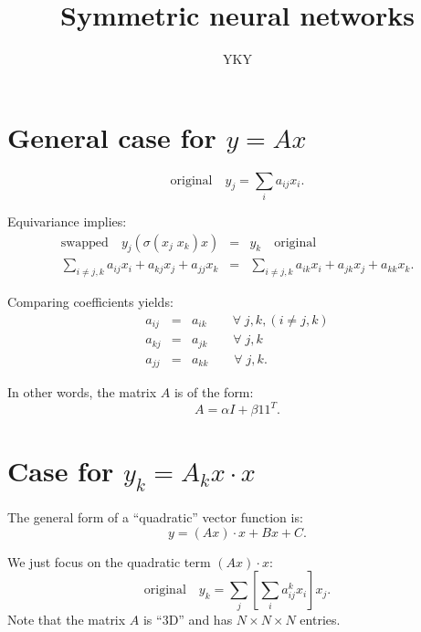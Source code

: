 

\title{Symmetric neural networks}
\author{YKY}


\maketitle

\section{General case for $y = A x$}

\begin{equation}
\boxed{\mbox{original}} \quad y_j = \sum_i a_{ij} x_i .
\end{equation}

Equivariance implies:
\begin{eqnarray}
\boxed{\mbox{swapped}} \quad y_j ( \sigma(x_j \; x_k) x) &=& y_k \quad \boxed{\mbox{original}} \\
\sum_{i \neq j,k} a_{ij} x_i + a_{kj} x_j + a_{jj} x_k &=& \sum_{i \neq j,k} a_{ik} x_i + a_{jk} x_j + a_{kk} x_k . \nonumber
\end{eqnarray}


Comparing coefficients yields:
\begin{eqnarray}
a_{ij} &=& a_{ik} \quad \quad \forall \; j, k, (i \neq j, k) \nonumber \\
a_{kj} &=& a_{jk} \quad \quad \forall \; j, k \nonumber \\
a_{jj} &=& a_{kk} \quad \quad \forall \; j, k .
\end{eqnarray}

In other words, the matrix $A$ is of the form:
\begin{equation}
A = \alpha I + \beta 1 1^T .
\end{equation}

\section{Case for $y_k = A_k x \cdot x$}

The general form of a ``quadratic'' vector function is:
\begin{equation}
y = (A x) \cdot x + B x + C .
\end{equation}

We just focus on the quadratic term $(A x) \cdot x$:
\begin{equation}
\boxed{\mbox{original}} \quad y_k = \sum_j \left[ \sum_i a_{ij}^k x_i \right] x_j .
\end{equation}
Note that the matrix $A$ is ``3D'' and has $N \times N \times N$ entries.

